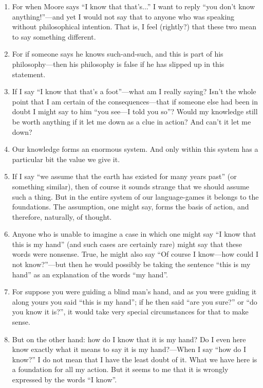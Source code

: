 \documentclass{book}
\begin{document}
\begin{enumerate}
\item
For when Moore says ``I know that that's...'' I want to reply ``you don't know
anything!''---and yet I would not say that to anyone who was speaking without
philosophical intention. That is, I feel (rightly?) that these two mean to say
something different.

\item
For if someone says he knows such-and-such, and this is part of his
philosophy---then his philosophy is false if he has slipped up in this
statement.

\item
If I say ``I know that that's a foot''---what am I really saying? Isn't the
whole point that I am certain of the consequences---that if someone else had
been in doubt I might say to him ``you see---I told you so''? Would my
knowledge still be worth anything if it let me down as a clue in action? And
can't it let me down?

\item
Our knowledge forms an enormous system. And only within this system has a
particular bit the value we give it.

\item
If I say ``we assume that the earth has existed for many years past'' (or
something similar), then of course it sounds strange that we should assume such
a thing. But in the entire system of our language-games it belongs to the
foundations. The assumption, one might say, forms the basis of action, and
therefore, naturally, of thought.

\item
Anyone who is unable to imagine a case in which one might say ``I know that
this is my hand'' (and such cases are certainly rare) might say that these
words were nonsense. True, he might also say ``Of course I know---how could I
not know?''---but then he would possibly be taking the sentence ``this is my
hand'' as an explanation of the words ``my hand''.

\item
For suppose you were guiding a blind man's hand, and as you were guiding it
along yours you said ``this is my hand''; if he then said ``are you sure?'' or
``do you know it is?'', it would take very special circumstances for that to
make sense.

\item
But on the other hand: how do I know that it is my hand? Do I even here know
exactly what it means to say it is my hand?---When I say ``how do I know?'' I
do not mean that I have the least doubt of it. What we have here is a
foundation for all my action. But it seems to me that it is wrongly expressed
by the words ``I know''.


\end{enumerate}
\end{document}
